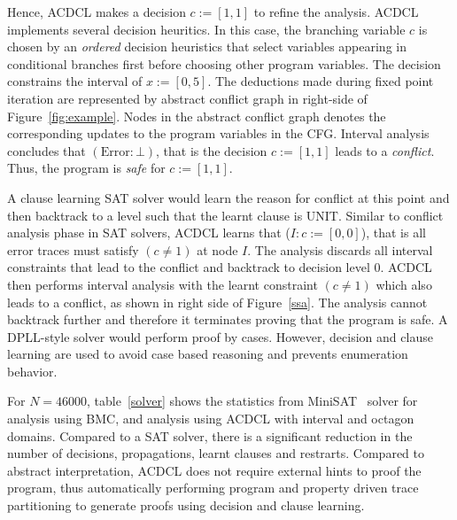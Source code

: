 Hence, ACDCL makes a decision $c:=[1,1]$ to refine the analysis.   
ACDCL implements several decision heuritics.  In this case, the 
branching variable $c$ is chosen by an {\em ordered} decision 
heuristics that select variables appearing in conditional branches 
first before choosing other program variables. 
The decision constrains the interval of $x:=[0,5]$.  The deductions made 
during fixed point iteration are represented by abstract conflict 
graph in right-side of Figure~\ref{fig:example}.  Nodes in the abstract 
conflict graph denotes the corresponding updates to the program 
variables in the CFG.  Interval analysis concludes that $(\text{Error}:\bot)$, that 
is the decision $c:=[1,1]$ leads to a {\em conflict}.  Thus, 
the program is {\em safe} for $c:=[1,1]$.  

A clause learning SAT solver would learn the reason for conflict at this 
point and then backtrack to a level such that the learnt clause is UNIT.  
Similar to conflict analysis phase in SAT solvers, ACDCL learns that 
(\(I: c:=[0,0]\)), that is all error traces must satisfy $(c \neq 1)$ 
at node $I$.  The analysis discards all interval constraints that
lead to the conflict and backtrack to decision level 0.  ACDCL then 
performs interval analysis with the learnt constraint $(c \neq 1)$ which also 
leads to a conflict, as shown in right side of Figure~\ref{ssa}.  The 
analysis cannot backtrack further and therefore it terminates proving 
that the program is safe.  A DPLL-style solver would perform proof by 
cases.  However, decision and clause learning are used to avoid case 
based reasoning and prevents enumeration behavior.     
   
For $N=46000$, table~\ref{solver} shows the statistics from 
MiniSAT~\cite{minisat} solver for analysis using BMC, and 
analysis using ACDCL with interval and octagon domains.  
Compared to a SAT solver, there is a significant reduction 
in the number of decisions, propagations, learnt clauses and 
restrarts.  Compared to abstract interpretation, ACDCL does 
not require external hints to proof the program, thus 
automatically performing program and property driven trace 
partitioning to generate proofs using decision and clause learning.  

